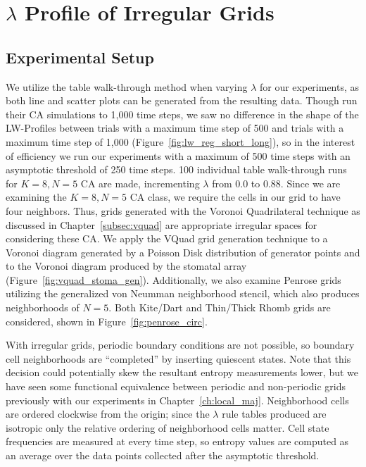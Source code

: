 \documentclass[a4paper,11pt]{report}
\begin{document}
\section{$\lambda$ Profile of Irregular Grids}

\subsection*{Experimental Setup}

We utilize the table walk-through method when varying $\lambda$ for our experiments, as both line and scatter plots can be generated from the resulting data. Though \citeauthor{wo90} run their CA simulations to 1,000 time steps, we saw no difference in the shape of the LW-Profiles between trials with a maximum time step of 500 and trials with a maximum time step of 1,000 (Figure~\ref{fig:lw_reg_short_long}), so in the interest of efficiency we run our experiments with a maximum of 500 time steps with an asymptotic threshold of 250 time steps. 100 individual table walk-through runs for $K=8, N=5$ CA are made, incrementing $\lambda$ from $0.0$ to $0.88$. Since we are examining the $K=8, N=5$ CA class, we require the cells in our grid to have four neighbors. Thus, grids generated with the Voronoi Quadrilateral technique as discussed in Chapter~\ref{subsec:vquad} are appropriate irregular spaces for considering these CA. We apply the VQuad grid generation technique to a Voronoi diagram generated by a Poisson Disk distribution of generator points and to the Voronoi diagram produced by the stomatal array (Figure~\ref{fig:vquad_stoma_gen}). Additionally, we also examine Penrose grids utilizing the generalized von Neumman neighborhood stencil, which also produces neighborhoods of $N=5$. Both Kite/Dart and Thin/Thick Rhomb grids are considered, shown in Figure~\ref{fig:penrose_circ}.

With irregular grids, periodic boundary conditions are not possible, so boundary cell neighborhoods are ``completed'' by inserting quiescent states. Note that this decision could potentially skew the resultant entropy measurements lower, but we have seen some functional equivalence between periodic and non-periodic grids previously with our experiments in Chapter~\ref{ch:local_maj}. Neighborhood cells are ordered clockwise from the origin; since the $\lambda$ rule tables produced are isotropic only the relative ordering of neighborhood cells matter. Cell state frequencies are measured at every time step, so entropy values are computed as an average over the data points collected after the asymptotic threshold.
\end{document}
